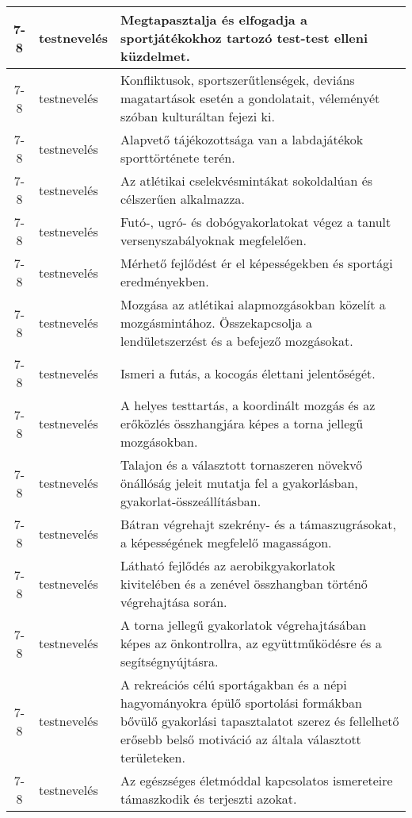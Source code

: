 \begin{small}
\begin{longtable}{c | p{2cm} |  p{11cm} }
              7-8 & testnevelés & Megtapasztalja és elfogadja a sportjátékokhoz tartozó test-test elleni küzdelmet. \\ \hline
              7-8 & testnevelés & Konfliktusok, sportszerűtlenségek, deviáns magatartások esetén a gondolatait, véleményét szóban kulturáltan fejezi ki. \\ \hline
              7-8 & testnevelés & Alapvető tájékozottsága van a labdajátékok sporttörténete terén. \\ \hline
              7-8 & testnevelés & Az atlétikai cselekvésmintákat sokoldalúan és célszerűen alkalmazza. \\ \hline
              7-8 & testnevelés & Futó-, ugró- és dobógyakorlatokat végez a tanult versenyszabályoknak megfelelően. \\ \hline
              7-8 & testnevelés & Mérhető fejlődést ér el képességekben és sportági eredményekben. \\ \hline
              7-8 & testnevelés & Mozgása az atlétikai alapmozgásokban közelít a mozgásmintához. Összekapcsolja a lendületszerzést és a befejező mozgásokat. \\ \hline
              7-8 & testnevelés & Ismeri a futás, a kocogás élettani jelentőségét. \\ \hline
              7-8 & testnevelés & A helyes testtartás, a koordinált mozgás és az erőközlés összhangjára képes a torna jellegű mozgásokban. \\ \hline
              7-8 & testnevelés & Talajon és a választott tornaszeren növekvő önállóság jeleit mutatja fel a gyakorlásban, gyakorlat-összeállításban. \\ \hline
              7-8 & testnevelés & Bátran végrehajt szekrény- és a támaszugrásokat, a képességének megfelelő magasságon. \\ \hline
              7-8 & testnevelés & Látható fejlődés az aerobikgyakorlatok kivitelében és a zenével összhangban történő végrehajtása során. \\ \hline
              7-8 & testnevelés & A torna jellegű gyakorlatok végrehajtásában képes az önkontrollra, az együttműködésre és a segítségnyújtásra. \\ \hline
              7-8 & testnevelés & A rekreációs célú sportágakban és a népi hagyományokra épülő sportolási formákban bővülő gyakorlási tapasztalatot szerez és fellelhető erősebb belső motiváció az általa választott területeken. \\ \hline
              7-8 & testnevelés & Az egészséges életmóddal kapcsolatos ismereteire támaszkodik és terjeszti azokat. \\ \hline

\end{longtable}
\end{small}

